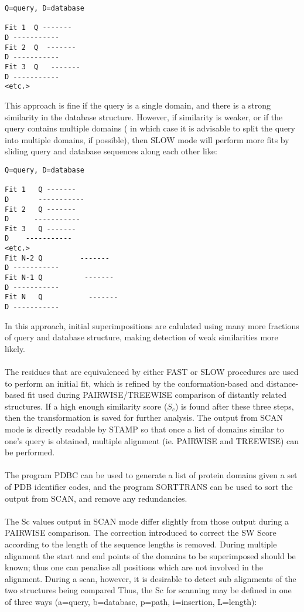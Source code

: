 \begin{verbatim}
Q=query, D=database

Fit 1  Q -------
D -----------
Fit 2  Q  -------
D -----------
Fit 3  Q   -------
D -----------
<etc.>
\end{verbatim}

This approach is fine if the query is a single domain, and there is a strong similarity in
the database structure.  However, if similarity is weaker, or if the query contains multiple domains (
in which case it is advisable to split the query into multiple domains, if possible), then SLOW mode will perform more fits by sliding query and database sequences along each other like:\\

\begin{verbatim}
Q=query, D=database

Fit 1   Q -------
D       -----------
Fit 2   Q -------
D      -----------
Fit 3   Q -------
D    -----------
<etc.>
Fit N-2 Q         -------
D -----------
Fit N-1 Q          -------
D -----------
Fit N   Q           -------
D -----------
\end{verbatim}

In this approach, initial superimpositions are calulated using many more fractions of query and
database structure, making detection of weak similarities more likely.\\
\\
The residues that are
equivalenced by either FAST or SLOW procedures are used to perform an initial fit, which is
refined by the conformation-based and distance-based fit used during 
PAIRWISE/TREEWISE comparison of distantly related structures.  If a 
high enough similarity score ($S_{c}$) is found after these three
steps, then the transformation is saved for further analysis.
The output from SCAN mode is directly readable by STAMP so
that once a list of domains similar to one's query is obtained,
multiple alignment (ie. PAIRWISE and TREEWISE) can be performed.\\
\\
The program PDBC can be used to generate a list of protein domains 
given a set of PDB identifier codes, and the program SORTTRANS can
be used to sort the output from SCAN, and remove any redundancies.\\
\\
The Sc values output in SCAN mode differ slightly from those
output during a PAIRWISE comparison.  The correction  introduced 
to correct the SW Score according to the length of the sequence 
lengths is removed.   During multiple alignment the start and end  
points of the domains to be superimposed should be known; thus one 
can penalise all positions which are not involved in the 
alignment.  During a scan, however, it is desirable to detect sub 
alignments of the two structures being compared 
Thus, the Sc for scanning may be defined in one of 
three ways (a=query, b=database, p=path, i=insertion, L=length):\\

